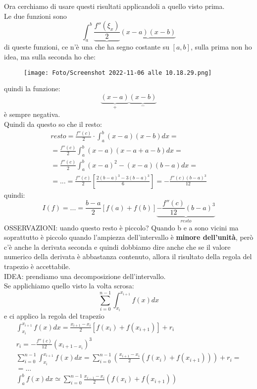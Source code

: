 \documentclass[a4paper, portrait]{book}
\numberwithin{equation}{chapter} %
\begin{document}
Ora cerchiamo di usare questi risultati applicandoli a quello visto prima.\\
Le due funzioni sono
\begin{equation}
    \int_a^b \underbrace{\frac{f''(\xi_x)}{2}}\underbrace{(x-a)(x-b)}
\end{equation}
di queste funzioni, ce n'è una che ha segno costante su $[a,b]$, sulla prima non ho idea, ma sulla seconda ho che:
\begin{figure}[h!]
    \centering
    \texttt{[image: Foto/Screenshot 2022-11-06 alle 10.18.29.png]}
    \caption{}
\end{figure}
quindi la funzione:
\begin{equation}
    \underbrace{(x-a)}_{+}\underbrace{(x-b)}_{-}
\end{equation} è sempre negativa.\\
Quindi da questo so che il resto:
\begin{gather}
    resto = \frac{f''(c)}{2}\cdot \int_a^b (x-a)(x-b)dx = \\
    = \frac{f''(c)}{2}\int_a^b (x-a)(x-a+a-b)dx =\\
    = \frac{f''(c)}{2}\int_a^b (x-a)^2 - (x-a)(b-a)dx = \\
    = ... = \frac{f''(c)}{2}\left[\frac{2(b-a)^3-3(b-a)^3}{6}\right] = -\frac{f''(c)(b-a)^3}{12}
\end{gather}
quindi:
\begin{equation}
    I(f) = ... = \frac{b-a}{2}\left[f(a)+f(b)\right] \underbrace{- \frac{f''(c)}{12}(b-a)^3}_{resto}
\end{equation}
OSSERVAZIONI:   uando questo resto è piccolo?
Quando b e a sono vicini ma soprattutto è piccolo quando l'ampiezza dell'intervallo è \textbf{minore dell'unità}, però c'è anche la derivata seconda e quindi dobbiamo dire anche che se il valore numerico della derivata è abbastanza contenuto, allora il risultato della regola del trapezio è accettabile.\\
IDEA: prendiamo una decomposizione dell'intervallo.\\
Se applichiamo quello visto la volta scrosa:
\begin{equation}
    \sum_{i=0}^{n-1}\int_{x_i}^{x_{i+1}}f(x) dx
\end{equation}
e ci applico la regola del trapezio
\begin{gather}
    \int_{x_i}^{x_{i+1}} f(x) dx = \frac{x_{i+1}-x_i}{2}\left[f(x_i)+f(x_{i+1})\right]+r_i\\
    r_i = -\frac{f''(c)}{12}\left(x_{i+1-x_i}\right)^3\\
    \sum_{i=0}^{n-1}\int_{x_i}^{x_{i+1}}f(x) dx = \sum_{i=0}^{n-1}\left(\frac{x_{i+1}-x_i}{2}\left(f(x_i)+f(x_{i+1})\right)\right) + r_i = \\
    = ...\\
    \int_a^b f(x) dx \simeq \sum_{i=0}^{n-1}\frac{x_{i-1}-x_i}{2}(f(x_i)+f(x_{i+1}))
\end{gather}
\end{document}
